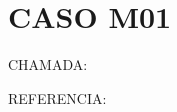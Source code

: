 \documentclass{undftex}
\begin{document}
\section*{CASO M01}\noindent CHAMADA:
\par\noindent REFERENCIA:\par\printbibliography[heading=none]
\end{document}
